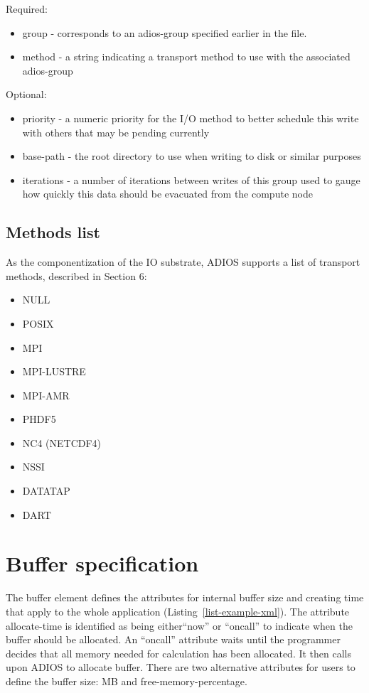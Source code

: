 Required:
\begin{itemize}
\item group - corresponds to an adios-group specified earlier in the file.
\item method - a string indicating a transport method to use with the associated adios-group
\end{itemize}

Optional: 
\begin{itemize}
\item priority - a numeric priority for the I/O method to better schedule this write with 
others that may be pending currently
\item base-path - the root directory to use when writing to disk or similar purposes
\item iterations - a number of iterations between writes of this group used to gauge how 
quickly this data should be evacuated from the compute node
\end{itemize}

\subsection{Methods list}
As the componentization of the IO substrate, ADIOS supports a list of transport 
methods, described in Section 6:

\begin{itemize}
\item NULL
\item POSIX
\item MPI
\item MPI-LUSTRE
\item MPI-AMR
\item PHDF5
\item NC4 (NETCDF4)
\item NSSI
\item DATATAP 
\item DART
\end{itemize}

\section{Buffer specification}
The buffer element defines the attributes for internal buffer size and creating 
time that apply to the whole application (Listing~\ref{list-example-xml}). The attribute allocate-time 
is identified as being either{\small  ``}now'' or ``oncall'' to indicate when the 
buffer should be allocated. An ``oncall'' attribute waits until the programmer 
decides that all memory needed for calculation has been allocated. It then calls 
upon ADIOS to allocate buffer. There are two alternative attributes for users to 
define the buffer size: MB and free-memory-percentage. 

